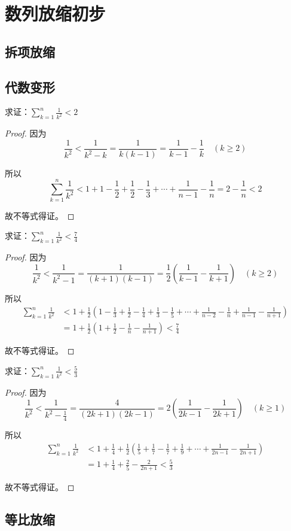 \section{数列放缩初步}
\clearpage
\subsection{拆项放缩}
\clearpage
\subsection{代数变形}
\begin{example}
    求证：\(\sum_{k=1}^{n}\frac{1}{k^2}<2\)
\end{example}
\begin{proof}
    
因为
\[
\frac{1}{k^2} < \frac{1}{k^2 - k} = \frac{1}{k(k-1)} = \frac{1}{k-1} - \frac{1}{k} \quad (k \geq 2)
\]

所以
\[
\sum_{k=1}^{n} \frac{1}{k^2} < 1 + 1 - \frac{1}{2} + \frac{1}{2} - \frac{1}{3} + \cdots + \frac{1}{n-1} - \frac{1}{n} = 2 - \frac{1}{n} < 2
\]

故不等式得证。



\end{proof}
\begin{example}
    求证：\(\sum_{k=1}^{n}\frac{1}{k^2}<\frac{7}{4}\)
\end{example}
\begin{proof}
    因为
\[
\frac{1}{k^2} < \frac{1}{k^2 - 1} = \frac{1}{(k+1)(k-1)} = \frac{1}{2}\left(\frac{1}{k-1} - \frac{1}{k+1}\right) \quad (k \geq 2)
\]

所以
\begin{align*}
\sum_{k=1}^{n} \frac{1}{k^2} &< 1 + \frac{1}{2}\left(1 - \frac{1}{3} + \frac{1}{2} - \frac{1}{4} + \frac{1}{3} - \frac{1}{5} + \cdots + \frac{1}{n-2} - \frac{1}{n} + \frac{1}{n-1} - \frac{1}{n+1}\right) \\
&= 1 + \frac{1}{2}\left(1 + \frac{1}{2} - \frac{1}{n} - \frac{1}{n+1}\right) < \frac{7}{4}
\end{align*}

故不等式得证。
\end{proof}
\begin{example}
    求证：\(\sum_{k=1}^{n}\frac{1}{k^2}<\frac{5}{3}\)
\end{example}
\begin{proof}
    



因为
\[
\frac{1}{k^2} < \frac{1}{k^2 - \frac{1}{4}} = \frac{4}{(2k+1)(2k-1)} = 2\left(\frac{1}{2k-1} - \frac{1}{2k+1}\right) \quad (k \geq 1)
\]

所以
\begin{align*}
\sum_{k=1}^{n} \frac{1}{k^2} &< 1 + \frac{1}{4} + \frac{1}{2}\left(\frac{1}{5} + \frac{1}{7} - \frac{1}{7} + \frac{1}{9} + \cdots + \frac{1}{2n-1} - \frac{1}{2n+1}\right) \\
&= 1 + \frac{1}{4} + \frac{2}{5} - \frac{2}{2n+1} < \frac{5}{3}
\end{align*}

故不等式得证。
\end{proof}

\begin{example}
    
\end{example}
\clearpage
\subsection{等比放缩}
\clearpage
